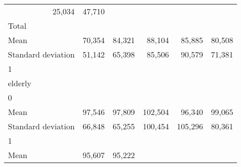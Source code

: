 \begin{tabular}{llllll}
  \multicolumn{1}{r}{25,034} &
  \multicolumn{1}{r}{47,710} \\
\multicolumn{1}{l}{\hspace{3em}Total} &
  \multicolumn{1}{|r}{} &
  \multicolumn{1}{r}{} &
  \multicolumn{1}{r}{} &
  \multicolumn{1}{r}{} &
  \multicolumn{1}{r}{} \\
\multicolumn{1}{l}{\hspace{4em}Mean} &
  \multicolumn{1}{|r}{70,354} &
  \multicolumn{1}{r}{84,321} &
  \multicolumn{1}{r}{88,104} &
  \multicolumn{1}{r}{85,885} &
  \multicolumn{1}{r}{80,508} \\
\multicolumn{1}{l}{\hspace{4em}Standard deviation} &
  \multicolumn{1}{|r}{51,142} &
  \multicolumn{1}{r}{65,398} &
  \multicolumn{1}{r}{85,506} &
  \multicolumn{1}{r}{90,579} &
  \multicolumn{1}{r}{71,381} \\
\multicolumn{1}{l}{\hspace{1em}1} &
  \multicolumn{1}{|r}{} &
  \multicolumn{1}{r}{} &
  \multicolumn{1}{r}{} &
  \multicolumn{1}{r}{} &
  \multicolumn{1}{r}{} \\
\multicolumn{1}{l}{\hspace{2em}elderly} &
  \multicolumn{1}{|r}{} &
  \multicolumn{1}{r}{} &
  \multicolumn{1}{r}{} &
  \multicolumn{1}{r}{} &
  \multicolumn{1}{r}{} \\
\multicolumn{1}{l}{\hspace{3em}0} &
  \multicolumn{1}{|r}{} &
  \multicolumn{1}{r}{} &
  \multicolumn{1}{r}{} &
  \multicolumn{1}{r}{} &
  \multicolumn{1}{r}{} \\
\multicolumn{1}{l}{\hspace{4em}Mean} &
  \multicolumn{1}{|r}{97,546} &
  \multicolumn{1}{r}{97,809} &
  \multicolumn{1}{r}{102,504} &
  \multicolumn{1}{r}{96,340} &
  \multicolumn{1}{r}{99,065} \\
\multicolumn{1}{l}{\hspace{4em}Standard deviation} &
  \multicolumn{1}{|r}{66,848} &
  \multicolumn{1}{r}{65,255} &
  \multicolumn{1}{r}{100,454} &
  \multicolumn{1}{r}{105,296} &
  \multicolumn{1}{r}{80,361} \\
\multicolumn{1}{l}{\hspace{3em}1} &
  \multicolumn{1}{|r}{} &
  \multicolumn{1}{r}{} &
  \multicolumn{1}{r}{} &
  \multicolumn{1}{r}{} &
  \multicolumn{1}{r}{} \\
\multicolumn{1}{l}{\hspace{4em}Mean} &
  \multicolumn{1}{|r}{95,607} &
  \multicolumn{1}{r}{95,222} &

\end{tabular}
